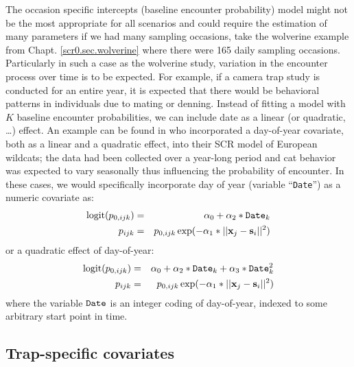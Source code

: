 The 
occasion specific intercepts (baseline encounter probability) model might not be the most
appropriate for all scenarios and could require the estimation of
many parameters if we had many sampling occasions, take the wolverine
example from Chapt. \ref{scr0.sec.wolverine} where there were 165
daily sampling occasions.  Particularly in such a case as the wolverine
study, variation in
the encounter process over time is to be expected. For
example, if a camera trap study is conducted for an entire year, it is
expected that there would be behavioral patterns in individuals due to 
mating or denning. Instead of fitting a model with $K$ baseline
encounter probabilities, we can include date as a linear (or
quadratic, \ldots) effect. An example can be found in
\citet{kery_etal:2011} who incorporated a day-of-year covariate, both
as a linear and a quadratic effect, into their SCR model of European
wildcats; the data had been collected over a year-long period and cat
behavior was expected to vary seasonally thus influencing the
probability of encounter.  In these cases, we would specifically
incorporate day of year (variable ``\mbox{\tt Date}'') as a numeric
covariate as:
\begin{eqnarray*}
\mbox{logit}(p_{0,ijk}) &=& \alpha_0 + \alpha_2*\mbox{\tt Date}_{k} \\
p_{ijk} &= &p_{0, ijk} \exp(- \alpha_1*||{\bf x}_{j}-{\bf s}_{i}||^2)
\end{eqnarray*}
or a quadratic effect of day-of-year:
\begin{eqnarray*}
\mbox{logit}(p_{0,ijk})& =& \alpha_0 + \alpha_2*\mbox{\tt Date}_{k}
 + \alpha_3*\mbox{\tt Date}_{k}^{2} \\
p_{ijk} &= &p_{0,ijk} \exp(- \alpha_{1}*||{\bf x}_{j}-{\bf s}_{i}||^2)
\end{eqnarray*}
where the variable $\mbox{\tt Date}$ is an integer coding of
day-of-year, indexed to some arbitrary start point in time.



\subsection{Trap-specific covariates}

